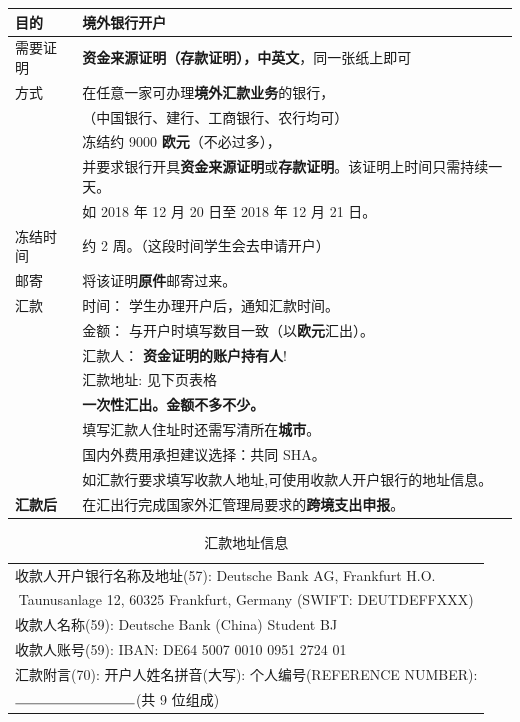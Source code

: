 \documentclass{article}
\begin{document}
\begin{center}
\begin{tabular}{ll}
  \toprule
  目的 & 境外银行\textbf{开户} \\ \midrule
  需要证明 & \textbf{资金来源证明（存款证明），\color{blue}中英文}，同一张纸上即可 \\ \midrule
  方式 & 在任意一家可办理\textbf{\color{blue}境外汇款业务}的银行，\\
  & （中国银行、建行、工商银行、农行均可） \\
  & 冻结约 9000 \textbf{\color{blue}欧元}（不必过多）， \\
  & 并要求银行开具\textbf{资金来源证明}或\textbf{存款证明}。该证明上时间只需持续一天。 \\
  & 如 2018 年 12 月 20 日至 2018 年 12 月 21 日。 \\
  冻结时间 & 约 2 周。（这段时间学生会去申请开户） \\ \midrule
  邮寄 & 将该证明\textbf{原件}邮寄过来。 \\ \midrule
  汇款 & {\color{blue}时间}： 学生办理开户后，通知汇款时间。 \\
  & {\color{blue}金额}： 与开户时填写数目一致（以\textbf{\color{blue}欧元}汇出）。 \\
  & {\color{blue}汇款人}： \textbf{资金证明的账户\color{blue}持有人}! \\
  & {\color{blue}汇款地址}: 见下页表格 \\
  & \textbf{一次性汇出。金额不多不少。} \\
  & 填写汇款人住址时还需写清所在\textbf{城市}。 \\
  & 国内外费用承担建议选择：共同 SHA。 \\
  & 如汇款行要求填写收款人地址,可使用收款人开户银行的地址信息。 \\ \midrule
  \textbf{汇款后} & 在汇出行完成国家外汇管理局要求的\textbf{跨境支出申报}。 \\  
  \bottomrule
\end{tabular}
\end{center}


\begin{table}
\caption{汇款地址信息}
\label{tb:address}
\begin{center}
\begin{tabular}{l}
\toprule
收款人开户银行名称及地址(57): Deutsche Bank AG, Frankfurt H.O. \\
\multicolumn{1}{c}{Taunusanlage 12, 60325 Frankfurt, Germany
 (SWIFT: DEUTDEFFXXX)} \\
收款人名称(59): Deutsche Bank (China) Student BJ \\
收款人账号(59): IBAN: DE64 5007 0010 0951 2724 01 \\
汇款附言(70): 开户人姓名拼音(大写): \underline{\hspace*{3cm}} 个人编号(REFERENCE NUMBER):\\
 $\rule{3cm}{0.15mm}$(共 9 位组成) \\ \bottomrule
\end{tabular}
\end{center}
\end{table}
\end{document}
